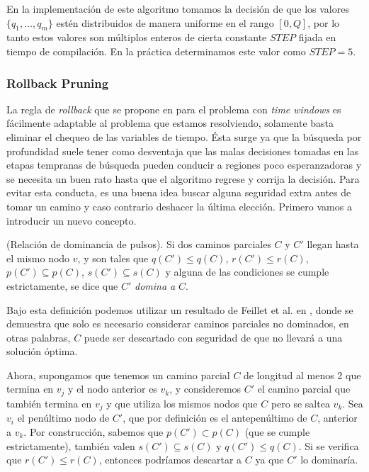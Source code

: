 En la implementación de este algoritmo tomamos la decisión de que los valores $\{q_1, \dots, q_m\}$ estén distribuidos de manera uniforme en el rango $[0, Q]$, por lo tanto estos valores son múltiplos enteros de cierta constante $STEP$ fijada en tiempo de compilación. En la práctica determinamos este valor como $STEP = 5$. 


\subsubsection{Rollback Pruning}

La regla de \emph{rollback} que se propone en \cite{lozano-duque-medaglia} para el problema con \emph{time windows} es fácilmente adaptable al problema que estamos resolviendo, solamente basta eliminar el chequeo de las variables de tiempo. Ésta surge ya que la búsqueda por profundidad suele tener como desventaja que las malas decisiones tomadas en las etapas tempranas de búsqueda pueden conducir a regiones poco esperanzadoras y se necesita un buen rato hasta que el algoritmo regrese y corrija la decisión. Para evitar esta conducta, es una buena idea buscar alguna seguridad extra antes de tomar un camino y caso contrario deshacer la última elección. Primero vamos a introducir un nuevo concepto.

\begin{definition}
    (Relación de dominancia de pulsos).
    Si dos caminos parciales $C$ y $C'$ llegan hasta el mismo nodo $v$, y son tales que $q(C') \leq q(C)$, $r(C') \leq r(C)$, $p(C') \subseteq p(C)$, $s(C') \subseteq s(C)$ y alguna de las condiciones se cumple estrictamente, se dice que $C'$ \emph{domina a} $C$.
\end{definition}

Bajo esta definición podemos utilizar un resultado de Feillet et al. en \cite{feillet-et-al}, donde se demuestra que solo es necesario considerar caminos parciales no dominados, en otras palabras, $C$ puede ser descartado con seguridad de que no llevará a una solución óptima.

Ahora, supongamos que tenemos un camino parcial $C$ de longitud al menos 2 que termina en $v_j$ y el nodo anterior es $v_k$, y consideremos $C'$ el camino parcial que también termina en $v_j$ y que utiliza los mismos nodos que $C$ pero se saltea $v_k$. Sea $v_i$ el penúltimo nodo de $C'$, que por definición es el antepenúltimo de $C$, anterior a $v_k$. Por construcción, sabemos que $p(C') \subset p(C)$ (que se cumple estrictamente), también valen $s(C') \subseteq s(C)$ y $q(C') \leq q(C)$. Si se verifica que $r(C') \leq r(C)$, entonces podríamos descartar a $C$ ya que $C'$ lo dominaría.

